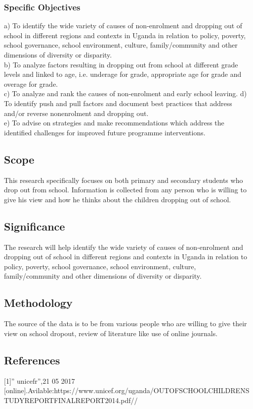 \documentclass[12pt,letterpaper]{article}
\begin{document}
\subsubsection{Specific Objectives}
a) To identify the wide variety of causes of non-enrolment and dropping out of school in different regions and contexts in Uganda in relation to policy, poverty, school governance, school environment, culture, family/community and other dimensions of diversity or disparity.\\
b) To analyze factors resulting in dropping out from school at different grade levels and linked to age, i.e. underage for grade, appropriate age for grade and overage for grade.\\
c) To analyze and rank the causes of non-enrolment and early school leaving.
d) To identify push and pull factors and document best practices that address and/or reverse nonenrolment and dropping out.\\
e) To advise on strategies and make recommendations which address the identified challenges for improved future programme interventions.\\ 
 \subsection{Scope}
 This research specifically focuses on both primary and secondary students who drop out from school. Information is collected from any person who is willing to give his view and how he thinks about the children dropping out of school.
 \subsection{Significance}
   The research will help identify the wide variety of causes of non-enrolment and dropping out of school in different regions and contexts in Uganda in relation to policy, poverty, school governance, school environment, culture, family/community and other dimensions of diversity or disparity.
 \subsection{ Methodology}
  The source of the data is to be from various people who are willing to give their view on school dropout, review of literature like use of online journals.
 
\subsection{References}
[1]” unicefr”,21 05 2017
[online].Avilable:https://www.unicef.org/uganda/OUTOFSCHOOLCHILDRENSTUDYREPORTFINALREPORT2014.pdf//
\end{document}
